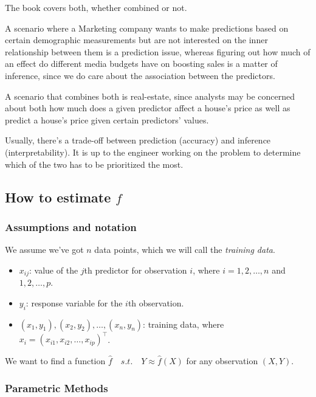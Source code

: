 \documentclass{article}
\theoremstyle{mytheoremstyle}
\theoremstyle{mytheoremstyle}
\theoremstyle{myproblemstyle}
\begin{document}
The book covers both, whether combined or not.

A scenario where a Marketing company wants to make
predictions based on certain demographic measurements
but are not interested on the inner relationship
between them is a prediction issue, whereas
figuring out how much of an effect do
different media budgets have on boosting
sales is a matter of inference, since
we do care about the association between the predictors.

A scenario that combines both is real-estate, since
analysts may be concerned about both how much
does a given predictor affect a house's price as well
as predict a house's price given certain predictors'
values.

Usually, there's a trade-off between
prediction (accuracy) and inference (interpretability).
It is up to the engineer working on the problem
to determine which of the two has to be prioritized the
most.




\subsection{How to estimate $ f $}

\subsubsection{Assumptions and notation} %

We assume we've got $ n $ data points,
which we will call the \textit{training data}.

\begin{itemize}
	\item $ x _{ij} $: value of the $ j $th predictor
	      for observation $ i $, where $ i = 1, 2, \dots, n $ and $ 1, 2, \dots, p $.
	\item $ y_i $: response variable for the $ i $th observation.
  \item $ {(x_1, y_1), (x_2, y_2), \dots, (x_n, y_n)} $: training data, where $ x_i = (x _{i1}, x _{i2}, \dots, x _{ip})^\top $.
\end{itemize}


We want to find a function  $ \hat{f} \quad s.t. \quad Y \approx \hat{f}(X) $ for any observation $ (X,Y) $.

\subsubsection{Parametric Methods} %
\end{document}
